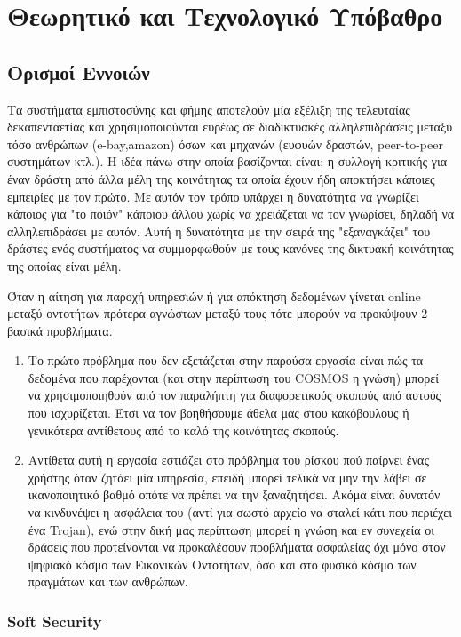 \chapter{Θεωρητικό και Τεχνολογικό Υπόβαθρο}\label{ch:bkg}
\section{Ορισμοί Εννοιών}

Τα συστήματα εμπιστοσύνης και φήμης αποτελούν μία εξέλιξη της τελευταίας δεκαπενταετίας και χρησιμοποιούνται ευρέως σε διαδικτυακές αλληλεπιδράσεις μεταξύ τόσο ανθρώπων (e-bay,amazon) όσων και μηχανών (ευφυών δραστών, peer-to-peer συστημάτων κτλ.). Η ιδέα πάνω στην οποία βασίζονται είναι: η συλλογή κριτικής για έναν δράστη από άλλα μέλη της κοινότητας τα οποία έχουν ήδη αποκτήσει κάποιες εμπειρίες με τον πρώτο. Με αυτόν τον τρόπο υπάρχει η δυνατότητα να γνωρίζει κάποιος για "το ποιόν"  κάποιου άλλου χωρίς να χρειάζεται να τον γνωρίσει, δηλαδή να αλληλεπιδράσει με αυτόν. Αυτή η δυνατότητα με την σειρά της "εξαναγκάζει" του δράστες ενός συστήματος να συμμορφωθούν με τους κανόνες της δικτυακή κοινότητας της οποίας είναι μέλη.

Όταν η αίτηση για παροχή υπηρεσιών ή για απόκτηση δεδομένων γίνεται online μεταξύ οντοτήτων πρότερα αγνώστων μεταξύ τους τότε μπορούν να προκύψουν 2 βασικά προβλήματα.
\begin{enumerate}
\item Το πρώτο πρόβλημα που δεν εξετάζεται στην παρούσα εργασία είναι πώς τα δεδομένα που παρέχονται (και στην περίπτωση του COSMOS η γνώση) μπορεί να χρησιμοποιηθούν από τον παραλήπτη για διαφορετικούς σκοπούς από αυτούς που ισχυρίζεται. Έτσι να τον βοηθήσουμε άθελα μας στου κακόβουλους ή γενικότερα αντίθετους από το καλό της κοινότητας σκοπούς.

\item Αντίθετα αυτή η εργασία εστιάζει στο πρόβλημα του ρίσκου πού παίρνει ένας χρήστης όταν ζητάει μία υπηρεσία, επειδή μπορεί τελικά να μην την λάβει σε ικανοποιητικό βαθμό οπότε να πρέπει να την ξαναζητήσει. Ακόμα είναι δυνατόν να κινδυνέψει η ασφάλεια του (αντί για σωστό αρχείο να σταλεί κάτι που περιέχει ένα Trojan), ενώ στην δική μας περίπτωση μπορεί η γνώση και εν συνεχεία οι δράσεις που προτείνονται να προκαλέσουν προβλήματα ασφαλείας όχι μόνο στον ψηφιακό κόσμο  των Εικονικών Οντοτήτων, όσο και στο φυσικό κόσμο των πραγμάτων και των ανθρώπων.
\end{enumerate}

\subsection{Soft Security}


